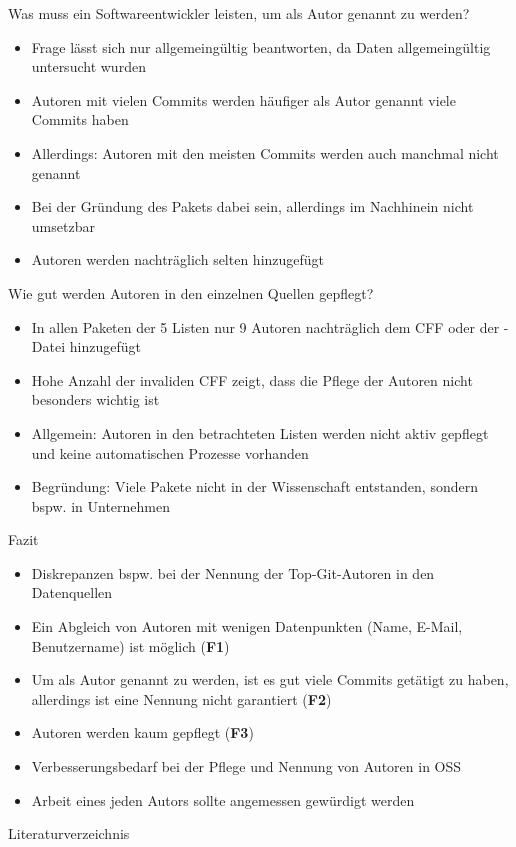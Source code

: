 \documentclass[%
    handout,
    aspectratio=1610,
    10pt,
    onlytextwidth, %
]{beamer}
\begin{document}
\begin{frame}{Was muss ein Softwareentwickler leisten, um als Autor genannt zu werden?}
    \begin{itemize}
        \item Frage lässt sich nur allgemeingültig beantworten, da Daten allgemeingültig untersucht wurden
        \item Autoren mit vielen Commits werden häufiger als Autor genannt \rightarrow{} viele Commits haben
        \item Allerdings: Autoren mit den meisten Commits werden auch manchmal nicht genannt
        \item Bei der Gründung des Pakets dabei sein, allerdings im Nachhinein nicht umsetzbar
        \item Autoren werden nachträglich selten hinzugefügt %
    \end{itemize}
\end{frame}

\begin{frame}{Wie gut werden Autoren in den einzelnen Quellen gepflegt?}
    \begin{itemize}
        \item In allen Paketen der 5 Listen nur 9 Autoren nachträglich dem CFF oder der -Datei hinzugefügt
        \item Hohe Anzahl der invaliden CFF zeigt, dass die Pflege der Autoren nicht besonders wichtig ist
        \item Allgemein: Autoren in den betrachteten Listen werden nicht aktiv gepflegt und keine automatischen Prozesse vorhanden
        \item Begründung: Viele Pakete nicht in der Wissenschaft entstanden, sondern bspw. in Unternehmen %
    \end{itemize}
\end{frame}

\begin{frame}{Fazit}
    \begin{itemize}
        \item Diskrepanzen bspw. bei der Nennung der Top-Git-Autoren in den Datenquellen
        \item Ein Abgleich von Autoren mit wenigen Datenpunkten (Name, E-Mail, Benutzername) ist möglich (\textcolor{links}{\textbf{F1}})
        \item Um als Autor genannt zu werden, ist es gut viele Commits getätigt zu haben, allerdings ist eine Nennung nicht garantiert (\textcolor{links}{\textbf{F2}})
        \item Autoren werden kaum gepflegt (\textcolor{links}{\textbf{F3}})
        \item Verbesserungsbedarf bei der Pflege und Nennung von Autoren in OSS
        \item Arbeit eines jeden Autors sollte angemessen gewürdigt werden
    \end{itemize}
\end{frame}

\begin{frame}{Literaturverzeichnis}
    \printbibliography
\end{frame}
\end{document}
